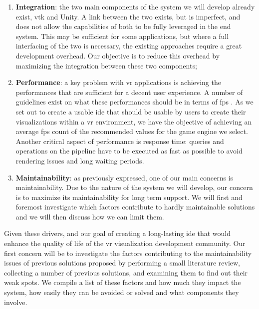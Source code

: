 \begin{enumerate}
    \item \textbf{Integration}: the two main components of the system we will develop already exist, \acrshort{vtk} and Unity. A link between the two exists, but is imperfect, and does not allow the capabilities of both to be fully leveraged in the end system. This may be sufficient for some applications, but where a full interfacing of the two is necessary, the existing approaches require a great development overhead. Our objective is to reduce this overhead by maximizing the integration between these two components;
    
    \item \textbf{Performance}: a key problem with \acrshort{vr} applications is achieving the performances that are sufficient for a decent user experience. A number of guidelines exist on what these performances should be in terms of \acrfull{fps} 
    \cite{noauthor_vr_nodate-1, noauthor_virtual_nodate}. As we set out to create a usable \acrshort{ide} that should be usable by users to create their visualizations within a \acrshort{vr} environment, we have the objective of achieving an average \acrshort{fps} count of the recommended values for the game engine we select. Another critical aspect of performance is response time: queries and operations on the pipeline have to be executed as fast as possible to avoid rendering issues and long waiting periods.
    
    \item \textbf{Maintainability}: as previously expressed, one of our main concerns is maintainability. Due to the nature of the system we will develop, our concern is to maximize its maintainability for long term support. We will first and foremost investigate which factors contribute to hardly maintainable solutions and we will then discuss how we can limit them.
\end{enumerate}

Given these drivers, and our goal of creating a long-lasting \acrshort{ide} that would enhance the quality of life of the \acrshort{vr} visualization development community. Our first concern will be to investigate the factors contributing to the maintainability issues of previous solutions proposed by performing a small literature review, collecting a number of previous solutions, and examining them to find out their weak spots. We compile a list of these factors and how much they impact the system, how easily they can be avoided or solved and what components they involve.


